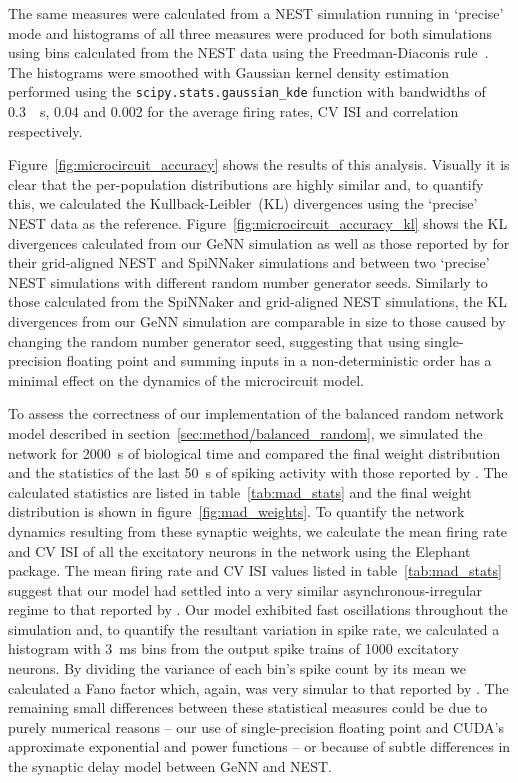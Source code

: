 \documentclass[utf8]{frontiersSCNS} %
\begin{document}
The same measures were calculated from a NEST simulation running in `precise' mode and histograms of all three measures were produced for both simulations using bins calculated from the NEST data using the Freedman-Diaconis rule~\citep{Freedman1981}.
The histograms were smoothed with Gaussian kernel density estimation performed using the \lstinline{scipy.stats.gaussian_kde} function with bandwidths of \SI{0.3}{\per\second}, \num{0.04} and \num{0.002} for the average firing rates, CV ISI and correlation respectively.

Figure~\ref{fig:microcircuit_accuracy} shows the results of this analysis.
Visually it is clear that the per-population distributions are highly similar and, to quantify this, we calculated the Kullback-Leibler~(KL) divergences using the `precise' NEST data as the reference.
Figure~\ref{fig:microcircuit_accuracy_kl} shows the KL divergences calculated from our GeNN simulation as well as those reported by \citet{VanAlbada2018} for their grid-aligned NEST and SpiNNaker simulations and between two `precise' NEST simulations with different random number generator seeds. 
Similarly to those calculated from the SpiNNaker and grid-aligned NEST simulations, the KL divergences from our GeNN simulation are comparable in size to those caused by changing the random number generator seed, suggesting that using single-precision floating point and summing inputs in a non-deterministic order has a minimal effect on the dynamics of the microcircuit model.

To assess the correctness of our implementation of the balanced random network model described in section~\ref{sec:method/balanced_random}, we simulated the network for \SI{2000}{\second} of biological time and compared the final weight distribution and the statistics of the last \SI{50}{\second} of spiking activity with those reported by \citet{Morrison2007}.
The calculated statistics are listed in table~\ref{tab:mad_stats} and the final weight distribution is shown in figure~\ref{fig:mad_weights}.
To quantify the network dynamics resulting from these synaptic weights, we calculate the mean firing rate and CV ISI of all the excitatory neurons in the network using the Elephant~\citep{Yegenoglu2018} package.
The mean firing rate and CV ISI values listed in table~\ref{tab:mad_stats} suggest that our model had settled into a very similar asynchronous-irregular regime to that reported by \citeauthor{Morrison2007}.
Our model exhibited fast oscillations throughout the simulation and, to quantify the resultant variation in spike rate, we calculated a histogram with \SI{3}{\milli\second} bins from the output spike trains of \num{1000} excitatory neurons.
By dividing the variance of each bin's spike count by its mean we calculated a Fano factor which, again, was very simular to that reported by \citeauthor{Morrison2007}.
The remaining small differences between these statistical measures could be due to purely numerical reasons -- our use of single-precision floating point and CUDA's approximate exponential and power functions -- or because of subtle differences in the synaptic delay model between GeNN and NEST.
\end{document}
